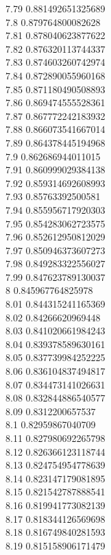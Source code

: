{7.79	0.881492651325689\\
7.8	0.879764800082628\\
7.81	0.878040623877622\\
7.82	0.876320113744337\\
7.83	0.874603260742974\\
7.84	0.872890055960168\\
7.85	0.871180490508893\\
7.86	0.869474555528361\\
7.87	0.867772242183932\\
7.88	0.866073541667014\\
7.89	0.864378445194968\\
7.9	0.862686944011015\\
7.91	0.860999029384138\\
7.92	0.859314692608993\\
7.93	0.85763392500581\\
7.94	0.855956717920303\\
7.95	0.854283062723575\\
7.96	0.852612950812029\\
7.97	0.850946373607273\\
7.98	0.849283322556027\\
7.99	0.847623789130037\\
8	0.845967764825978\\
8.01	0.844315241165369\\
8.02	0.84266620969448\\
8.03	0.841020661984243\\
8.04	0.839378589630161\\
8.05	0.837739984252225\\
8.06	0.836104837494817\\
8.07	0.834473141026631\\
8.08	0.832844886540577\\
8.09	0.8312200657537\\
8.1	0.82959867040709\\
8.11	0.827980692265798\\
8.12	0.826366123118744\\
8.13	0.824754954778639\\
8.14	0.823147179081895\\
8.15	0.821542787888541\\
8.16	0.819941773082139\\
8.17	0.818344126569698\\
8.18	0.816749840281593\\
8.19	0.815158906171479\\
}
